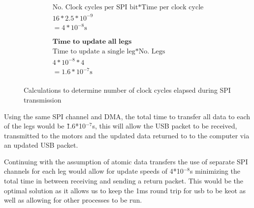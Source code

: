 \begin{figure}[!t]
\begin{minipage}{0.5\textwidth}
\begin{gather*}
    		    	\text{No. Clock cycles per SPI bit} * \text{Time per clock cycle}\\
    		    	16 * 2.5*10^{-9}\\
    		    	=4*10^{-8}\text{s}\\
    		    	\\
    		    	\\
    		    	\textbf{Time to update all legs}\\
    		    	\text{Time to update a single leg} * \text{No. Legs}\\
    		    	4*10^{-8}* 4\\
    		        =1.6*10^{-7}\text{s}\\
    			\end{gather*}  
			\end{minipage}
			\caption{Calculations to determine number of clock cycles elapsed during SPI transmission}
   			\label{fig:my_label}
   		    \end{figure}

			Using the same SPI channel and DMA, the total time to transfer all data to each of the legs would be \~ 1.6*10$^{-7}$s, this will allow the USB packet to be received, transmitted to the motors and the updated data returned to to the computer via an updated USB packet. \newline
		
		Continuing with the assumption of atomic data transfers the use of separate SPI channels for each leg would allow for update speeds of 4*10$^{-8}$s minimizing the total time in between receiving and sending a return packet. This would be the optimal solution as it allows us to keep the 1ms round trip for usb to be keot as well as allowing for other processes to be run.  
		
